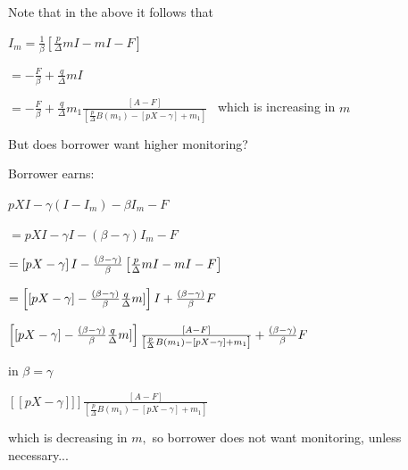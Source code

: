 \documentclass{article}
\begin{document}
Note that in the above it follows that

$I_{m}=\frac{1}{\beta }\left[ \frac{p}{\Delta }mI-mI-F\right] $

$=-\frac{F}{\beta }+\frac{q}{\Delta }mI$

$=-\frac{F}{\beta }+\frac{q}{\Delta }m_{1}\frac{\left[ A-F\right] }{\left[ 
\frac{p}{\Delta }B(m_{1})-\left[ pX-\gamma \right] +m_{1}\right] }$ \ which
is increasing in $m$

But does borrower want higher monitoring?

Borrower earns:

$pXI-\gamma (I-I_{m})-\beta I_{m}-F$

$=pXI-\gamma I-(\beta -\gamma )I_{m}-F$

$=\left[ pX-\gamma \right] I-\frac{(\beta -\gamma )}{\beta }\left[ \frac{p}{%
\Delta }mI-mI-F\right] $

$=\left[ \left[ pX-\gamma \right] -\frac{(\beta -\gamma )}{\beta }\frac{q}{%
\Delta }m]\right] I+\frac{(\beta -\gamma )}{\beta }F$

$\left[ \left[ pX-\gamma \right] -\frac{(\beta -\gamma )}{\beta }\frac{q}{%
\Delta }m]\right] \frac{\left[ A-F\right] }{\left[ \frac{p}{\Delta }B(m_{1})-%
\left[ pX-\gamma \right] +m_{1}\right] }+\frac{(\beta -\gamma )}{\beta }F$

in $\beta =\gamma $

$\left[ \left[ pX-\gamma \right] ]\right] \frac{\left[ A-F\right] }{\left[ 
\frac{p}{\Delta }B(m_{1})-\left[ pX-\gamma \right] +m_{1}\right] }$

which is decreasing in $m,$ so borrower does not want monitoring, unless
necessary...
\end{document}
